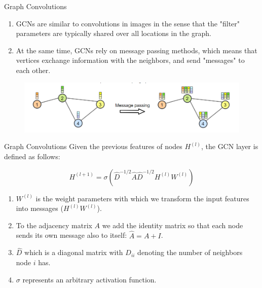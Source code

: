 \documentclass{beamer}
\begin{document}
	\begin{frame}[t]{Graph Convolutions}\vspace{4pt}
		\begin{enumerate}
			\item GCNs are similar to convolutions in images in the sense that the "filter" parameters are typically shared over all locations in the graph. 
			\item At the same time, GCNs rely on message passing methods, which means that vertices exchange information with the neighbors, and send "messages" to each other.
		\end{enumerate}
		
		\begin{figure}
			\centering
			\includegraphics[scale=0.4]{sg2.png}
		\end{figure}
	\end{frame}
	
	\begin{frame}[t]{Graph Convolutions}\vspace{4pt}
		 Given the previous features of nodes $H^{(l)}$, the GCN layer is defined as follows:
		
		$$H^{(l+1)} = \sigma\left(\hat{D}^{-1/2}\hat{A}\hat{D}^{-1/2}H^{(l)}W^{(l)}\right)$$
		\begin{enumerate}
			\item $W^{(l)}$ is the weight parameters with which we transform the input features into messages ($H^{(l)}W^{(l)}$). 
			\item To the adjacency matrix $A$ we add the identity matrix so that each node sends its own message also to itself: $\hat{A}=A+I$. 
			\item $\hat{D}$ which is a diagonal matrix with $D_{ii}$ denoting the number of neighbors node $i$ has. 
			\item $\sigma$ represents an arbitrary activation function.
	\end{enumerate}
	\end{frame}
\end{document}
